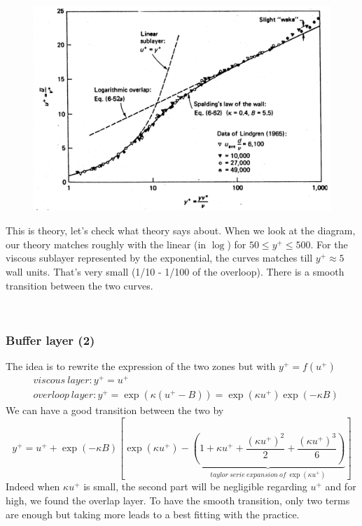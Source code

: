 		\begin{figure}
		\vspace{-5mm}
		\includegraphics[scale=0.2]{ch4/8}
		\label{fig:4.8}
		\end{figure}
		This is theory, let's check what theory says about. When we look at the diagram, our theory matches roughly with the linear (in $\log$) for $50\leq y^+ \leq 500$. For the viscous sublayer represented by the exponential, the curves matches till $y^+ \approx 5$ wall units. That's very small (1/10 - 1/100 of the overloop). There is a smooth transition between the two curves. 
		
	\	\\ \subsubsection{Buffer layer (2)}
			The idea is to rewrite the expression of the two zones but with $y^+ = f(u^+)$ 
			\begin{equation}
			\begin{aligned}
				&viscous \ layer : y^+ = u^+\\
				&overloop \ layer : y^+ =  \exp (\kappa(u^+ - B))= \exp (\kappa u^+)\exp (-\kappa B)
			\end{aligned}
			\end{equation}
			We can have a good transition between the two by 
			\begin{equation}
				y^+ = u^+ + \exp (-\kappa B)\left[ \exp(\kappa u^+) - \underbrace{\left( 1 + \kappa u^+ +  \frac{(\kappa u^+)^2}{2}  +  \frac{(\kappa u^+)^3}{6}\right)}_{taylor \ serie \ expansion \ of\ \exp(\kappa u^+)}\right]
			\end{equation}
			Indeed when $\kappa u^+$ is small, the second part will be negligible regarding $u^+$ and for high, we found the overlap layer. To have the smooth transition, only two terms are enough but taking more leads to a best fitting with the practice. 
			
